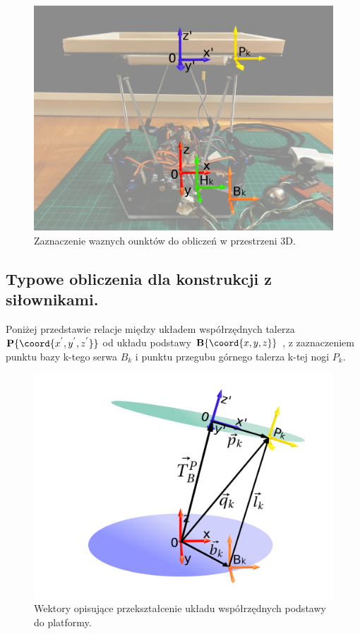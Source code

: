 

\begin{figure}[!h]
    \label{fig:anzelm}
    \centering
    \includegraphics[width=\textwidth]{img/Platforma_rzeczywista_punkty.jpg}
    \caption{Zaznaczenie waznych ounktów do obliczeń w przestrzeni 3D.}
\end{figure}


\subsection{Typowe obliczenia dla konstrukcji z siłownikami.}
Poniżej przedstawie relacje między układem współrzędnych talerza
$\textbf{P}\{\coord{x^{'},y^{'},z^{'}}\}$ 
od układu podstawy 
$\textbf{B}\{\coord{x,y,z}\}$ 
, z zaznaczeniem punktu bazy k-tego serwa $B_k$ i punktu przegubu górnego talerza k-tej nogi $P_k$. 

\begin{figure}[!h]
    \label{fig:anzelm}
    \centering
    \includegraphics[width=0.5\linewidth]{img/wektory_kinematyka.png}
    \caption{Wektory opisujące przekształcenie układu współrzędnych podstawy do platformy.}
\end{figure}

